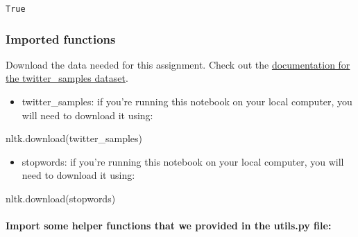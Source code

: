 \documentclass[11pt]{article}
\makeatletter
\providecommand{\tightlist}{%
      \setlength{\itemsep}{0pt}\setlength{\parskip}{0pt}}
\newenvironment{Shaded}{}{}
\newcommand{\StringTok}[1]{\textcolor[rgb]{0.25,0.44,0.63}{{#1}}}
\newcommand{\NormalTok}[1]{{#1}}
\newcommand{\boxspacing}{\kern\kvtcb@left@rule\kern\kvtcb@boxsep}
\newcommand{\prompt}[4]{
        \ttfamily\llap{{\color{#2}[#3]:\hspace{3pt}#4}}\vspace{-\baselineskip}
    }
\makeatother
\begin{document}
            \begin{tcolorbox}[breakable, size=fbox, boxrule=.5pt, pad at break*=1mm, opacityfill=0]
\prompt{Out}{outcolor}{1}{\boxspacing}
\begin{Verbatim}[commandchars=\\\{\}]
True
\end{Verbatim}
\end{tcolorbox}
        
    \hypertarget{imported-functions}{%
\subsubsection{Imported functions}\label{imported-functions}}

Download the data needed for this assignment. Check out the
\href{http://www.nltk.org/howto/twitter.html}{documentation for the
twitter\_samples dataset}.

\begin{itemize}
\tightlist
\item
  twitter\_samples: if you're running this notebook on your local
  computer, you will need to download it using:
\end{itemize}

\begin{Shaded}
\begin{Highlighting}[]
\NormalTok{nltk.download(}\StringTok{\textquotesingle{}twitter\_samples\textquotesingle{}}\NormalTok{)}
\end{Highlighting}
\end{Shaded}

\begin{itemize}
\tightlist
\item
  stopwords: if you're running this notebook on your local computer, you
  will need to download it using:
\end{itemize}

\begin{Shaded}
\begin{Highlighting}[]
\NormalTok{nltk.download(}\StringTok{\textquotesingle{}stopwords\textquotesingle{}}\NormalTok{)}
\end{Highlighting}
\end{Shaded}

\hypertarget{import-some-helper-functions-that-we-provided-in-the-utils.py-file}{%
\paragraph{Import some helper functions that we provided in the utils.py
file:}\label{import-some-helper-functions-that-we-provided-in-the-utils.py-file}}
\end{document}
